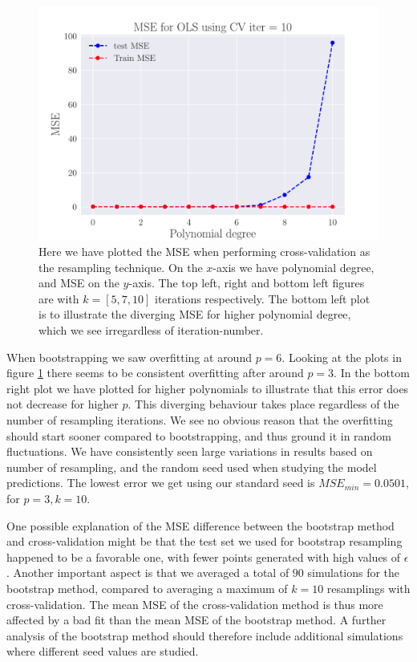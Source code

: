 \documentclass[reprint,english,notitlepage,aps,nobalancelastpage,nofootinbib]{revtex4-1}  %
\begin{document}
\begin{figure}[h]
	\endminipage\hfill
	\includegraphics[width=\linewidth]{MSE_OLS_n30_eps02_pol10_CV_re10.pdf}
	\endminipage
	\caption{Here we have plotted the MSE when performing cross-validation as the resampling technique. On the $x$-axis we have polynomial degree, and MSE on the $y$-axis. The top left, right and bottom left figures are with $k=[5, 7, 10]$ iterations respectively. The bottom left plot is to illustrate the diverging MSE for higher polynomial degree, which we see irregardless of iteration-number.} \label{fig:CV_OLS}
\end{figure}

When bootstrapping we saw overfitting at around $p=6$. Looking at the plots in figure \ref{fig:CV_OLS} there seems to be consistent overfitting after around $p=3$. In the bottom right plot we have plotted for higher polynomials to illustrate that this error does not decrease for higher $p$. This diverging behaviour takes place regardless of the number of resampling iterations. We see no obvious reason that the overfitting should start sooner compared to bootstrapping, and thus ground it in random fluctuations. We have consistently seen large variations in results based on number of resampling, and the random seed used when studying the model predictions. The lowest error we get using our standard seed is $MSE_{min}=0.0501$, for $p=3, k=10$.

One possible explanation of the MSE difference between the bootstrap method and cross-validation might be that the test set we used for bootstrap resampling happened to be a favorable one, with fewer points generated with high values of $\epsilon$. Another important aspect is that we averaged a total of $90$ simulations for the bootstrap method, compared to averaging a maximum of $k=10$ resamplings with cross-validation. The mean MSE of the cross-validation method is thus more affected by a bad fit than the mean MSE of the bootstrap method. A further analysis of the bootstrap method should therefore include additional simulations where different seed values are studied.
\end{document}
